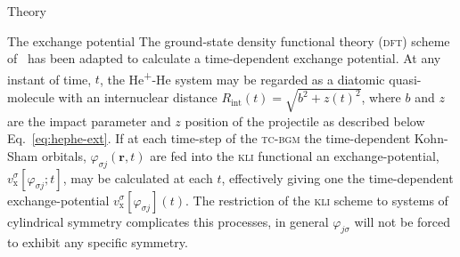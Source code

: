 \documentclass[aps, pra, reprint, groupedaddress, amsfonts,
               amsmath, amssymb, showpacs, nofootinbib]{revtex4-1}
\begin{document}
\begin{section}{Theory \label{sec:theory}}
\begin{subsection}{The exchange potential \label{sec:xpot}}
      The ground-state density functional theory (\textsc{dft}) scheme of~\cite{diamol} has been adapted
      to calculate a time-dependent exchange potential. At any instant of time, $t$, the
      He\textsuperscript{+}-He system may be regarded as a diatomic quasi-molecule with an internuclear
      distance $R_\mathrm{int}(t) = \sqrt{b^2 + z(t)^2}$, where $b$ and $z$ are the impact parameter and
      $z$ position of the projectile as described below Eq.~\eqref{eq:hephe-ext}. If at each time-step
      of the \textsc{tc-bgm} the time-dependent Kohn-Sham orbitals, $\varphi_{\sigma j}(\mathbf{r},t)$
      are fed into the \textsc{kli} functional an exchange-potential,
      $v^{\sigma}_\mathrm{x}[\varphi_{\sigma j};t]$, may be calculated at each $t$, effectively
      giving one the time-dependent exchange-potential $v^{\sigma}_\mathrm{x}[\varphi_{\sigma j}](t)$.
      The restriction of the \textsc{kli} scheme to systems of cylindrical symmetry complicates this
      processes, in general $\varphi_{j \sigma}$ will not be forced to exhibit any specific symmetry.
      

\end{subsection}
\end{section}
\end{document}
